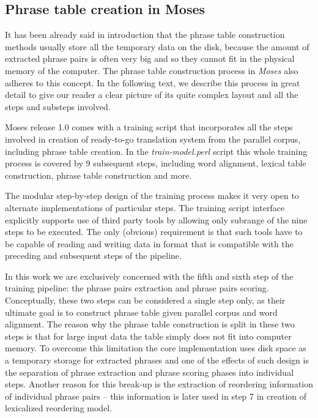 \subsection{Phrase table creation in Moses}
\label{sec:phrase-table-creation-in-moses}

It has been already said in introduction that the phrase table construction methods
usually store all the temporary data on the disk, because the amount of extracted
phrase pairs is often very big and so they cannot fit in the physical memory of
the computer.
The phrase table construction process in \emph{Moses} also adheres to this concept.
In the following text, we describe this process in great detail to give our reader
a clear picture of its quite complex layout and all the steps and substeps involved.

Moses release 1.0 comes
with a training script that incorporates all the steps involved in creation of
ready-to-go translation system from the parallel corpus, including phrase table creation.
In the \emph{train-model.perl} script this whole training process is covered by
9 subsequent steps,
including word alignment, lexical table construction, phrase table construction and more.

The modular step-by-step design of the training process makes it very open to
alternate implementations of particular steps.
The training script interface explicitly supports use of third party tools by
allowing only subrange of the nine steps to be executed.
The only (obvious) requirement is that such tools have to be capable of reading and
writing data in format that is compatible with the preceding and subsequent steps
of the pipeline.

In this work we are exclusively concerned with the fifth and sixth step of
the training pipeline:
the phrase pairs extraction
and phrase pairs scoring.
Conceptually, these two steps can be considered a single step only, as their ultimate
goal is to construct phrase table given parallel corpus and word alignment.
The reason why the phrase table construction is split in these two steps is that
for large input data the table simply does not fit into computer memory.
To overcome this limitation the core implementation uses disk space as a temporary storage
for extracted phrases and one of the effects of such design is the separation of
phrase extraction and phrase scoring phases into individual steps.
Another reason for this break-up is the extraction of reordering information
of individual phrase pairs -- this information is later used in step 7 in creation
of lexicalized reordering model.

